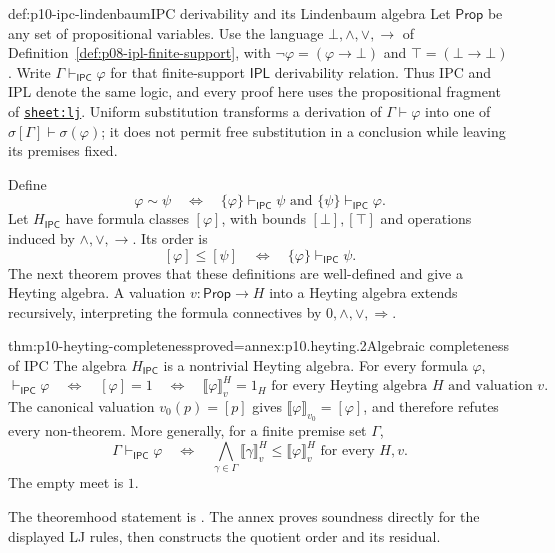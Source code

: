 \begin{hbdefinition}{def:p10-ipc-lindenbaum}{IPC derivability and its Lindenbaum algebra}
Let \(\mathsf{Prop}\) be any set of propositional variables.
Use the language \(\bot,\land,\lor,\to\) of
Definition~\ref{def:p08-ipl-finite-support}, with
\(\neg\varphi=(\varphi\to\bot)\) and
\(\top=(\bot\to\bot)\).
Write \(\Gamma\vdash_{\mathsf{IPC}}\varphi\) for that
finite-support \(\mathsf{IPL}\) derivability relation.
Thus IPC and IPL denote the same logic, and every proof here
uses the propositional fragment of
\hyperref[sheet:lj]{\texttt{sheet:lj}}.
Uniform substitution transforms a derivation of
\(\Gamma\vdash\varphi\) into one of
\(\sigma[\Gamma]\vdash\sigma(\varphi)\); it does not permit
free substitution in a conclusion while leaving its premises fixed.

Define
\[
 \varphi\sim\psi
 \quad\Longleftrightarrow\quad
 \{\varphi\}\vdash_{\mathsf{IPC}}\psi
       \text{ and }\{\psi\}\vdash_{\mathsf{IPC}}\varphi.
\]
Let \(H_{\mathsf{IPC}}\) have formula classes \([\varphi]\),
with bounds \([\bot],[\top]\) and operations induced by
\(\land,\lor,\to\).
Its order is
\[
 [\varphi]\leq[\psi]
          \quad\Longleftrightarrow\quad
          \{\varphi\}\vdash_{\mathsf{IPC}}\psi.
\]
The next theorem proves that these definitions are well-defined
and give a Heyting algebra.
A valuation \(v:\mathsf{Prop}\to H\) into a Heyting algebra extends
recursively, interpreting the formula connectives by
\(0,\wedge,\vee,\Rightarrow\).
\end{hbdefinition}

\begin{hbtheorem}{thm:p10-heyting-completeness}{proved=annex:p10.heyting.2}{Algebraic completeness of IPC}
The algebra \(H_{\mathsf{IPC}}\) is a nontrivial Heyting algebra.
For every formula \(\varphi\),
\[
 \vdash_{\mathsf{IPC}}\varphi
 \quad\Longleftrightarrow\quad
 [\varphi]=1
 \quad\Longleftrightarrow\quad
 \llbracket\varphi\rrbracket_v^H=1_H
       \text{ for every Heyting algebra }H\text{ and valuation }v.
\]
The canonical valuation \(v_0(p)=[p]\) gives
\(\llbracket\varphi\rrbracket_{v_0}=[\varphi]\), and therefore
refutes every non-theorem.
More generally, for a finite premise set \(\Gamma\),
\[
 \Gamma\vdash_{\mathsf{IPC}}\varphi
 \quad\Longleftrightarrow\quad
 \bigwedge_{\gamma\in\Gamma}\llbracket\gamma\rrbracket_v^H
       \leq\llbracket\varphi\rrbracket_v^H
       \text{ for every }H,v.
\]
The empty meet is \(1\).
\end{hbtheorem}

The theoremhood statement is
\cite[Theorem~2.2.16, p.~25]{Bezhanishvili2006Thesis}.
The annex proves soundness directly for the displayed LJ rules,
then constructs the quotient order and its residual.

